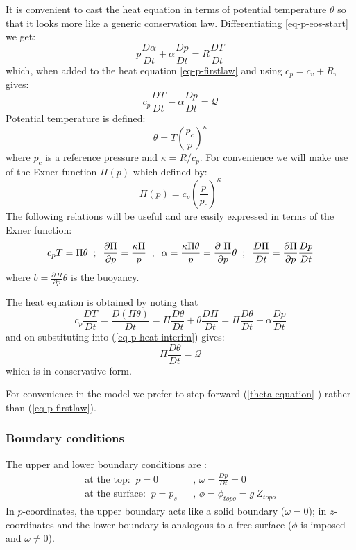 It is convenient to cast the heat equation in terms of potential temperature 
$\theta $ so that it looks more like a generic conservation law.
Differentiating \ref{eq-p-eos-start} we get: 
\[
p\frac{D\alpha }{Dt}+\alpha \frac{Dp}{Dt}=R\frac{DT}{Dt}
\]
which, when added to the heat equation \ref{eq-p-firstlaw} and using $%
c_{p}=c_{v}+R$, gives: 
\begin{equation}
c_{p}\frac{DT}{Dt}-\alpha \frac{Dp}{Dt}=\mathcal{Q}
\label{eq-p-heat-interim}
\end{equation}
Potential temperature is defined: 
\begin{equation}
\theta =T(\frac{p_{c}}{p})^{\kappa }  \label{eq-potential-temp}
\end{equation}
where $p_{c}$ is a reference pressure and $\kappa =R/c_{p}$. For convenience
we will make use of the Exner function $\Pi (p)$ which defined by: 
\begin{equation}
\Pi (p)=c_{p}(\frac{p}{p_{c}})^{\kappa }  \label{Exner}
\end{equation}
The following relations will be useful and are easily expressed in terms of
the Exner function: 
\[
c_{p}T=\Pi \theta \;\;;\;\;\frac{\partial \Pi }{\partial p}=\frac{\kappa \Pi 
}{p}\;\;;\;\;\alpha =\frac{\kappa \Pi \theta }{p}=\frac{\partial \ \Pi }{%
\partial p}\theta \;\;;\;\;\frac{D\Pi }{Dt}=\frac{\partial \Pi }{\partial p}%
\frac{Dp}{Dt}
\]
where $b=\frac{\partial \ \Pi }{\partial p}\theta $ is the buoyancy.

The heat equation is obtained by noting that 
\[
c_{p}\frac{DT}{Dt}=\frac{D(\Pi \theta )}{Dt}=\Pi \frac{D\theta }{Dt}+\theta 
\frac{D\Pi }{Dt}=\Pi \frac{D\theta }{Dt}+\alpha \frac{Dp}{Dt}
\]
and on substituting into (\ref{eq-p-heat-interim}) gives: 
\begin{equation}
\Pi \frac{D\theta }{Dt}=\mathcal{Q}  \label{theta-equation}
\end{equation}
which is in conservative form.

For convenience in the model we prefer to step forward (\ref{theta-equation}%
) rather than (\ref{eq-p-firstlaw}).

\subsubsection{Boundary conditions}

The upper and lower boundary conditions are : 
\begin{eqnarray*}
\mbox{at the top:}\;\;p=0 &&\text{, }\omega =\frac{Dp}{Dt}=0 \\
\mbox{at the surface:}\;\;p=p_{s} &&\text{, }\phi =\phi _{topo}=g~Z_{topo}
\end{eqnarray*}
In $p$-coordinates, the upper boundary acts like a solid boundary ($\omega
=0 $); in $z$-coordinates and the lower boundary is analogous to a free
surface ($\phi $ is imposed and $\omega \neq 0$).

